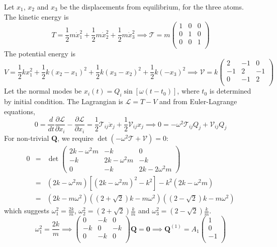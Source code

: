 \documentclass[a4paper]{article}
\begin{document}
\begin{ans}
Let $x_1$, $x_2$ and $x_3$ be the displacements from equilibrium, for the three atoms. The kinetic energy is 
$$T=\frac{1}{2}m\dot{x}_1^2+\frac{1}{2}m\dot{x}_2^2+\frac{1}{2}m\dot{x}_3^2\implies \mathcal{T}=m\begin{pmatrix}1&0&0\\0&1&0\\0&0&1\\\end{pmatrix}$$
The potential energy is
$$V=\frac{1}{2}kx_1^2+\frac{1}{2}k(x_2-x_1)^2+\frac{1}{2}k(x_3-x_2)^2+\frac{1}{2}k(-x_3)^2\implies \mathcal{V}=k\begin{pmatrix}2&-1&0\\-1&2&-1\\0&-1&2\\\end{pmatrix}$$
Let the normal modes be $x_i(t)=Q_i\sin[\omega(t-t_0)]$, where $t_0$ is determined by initial condition. The Lagrangian is $\mathcal{L}=T-V$ and from Euler-Lagrange equations,
$$0=\frac{d}{dt}\frac{\partial\mathcal{L}}{\partial\dot{x}_i}-\frac{\partial\mathcal{L}}{\partial x_i}=\frac{1}{2}\mathcal{T}_{ij}\ddot{x}_j+\frac{1}{2}\mathcal{V}_{ij}x_j\implies 0=-\omega^2\mathcal{T}_{ij}Q_j+\mathcal{V}_{ij}Q_j$$
For non-trivial $\mathbf{Q}$, we require $\det(-\omega^2\mathcal{T}+\mathcal{V})=0$:
\begin{eqnarray}
0&=&\det\begin{pmatrix}2k-\omega^2m&-k&0\\-k&2k-\omega^2m&-k\\0&-k&2k-2\omega^2m\end{pmatrix}\nonumber\\&=&(2k-\omega^2m)[(2k-\omega^2m)^2-k^2]-k^2(2k-\omega^2m)\nonumber\\&=&(2k-m\omega^2)((2+\sqrt{2})k-m\omega^2)((2-\sqrt{2})k-m\omega^2)\nonumber
\end{eqnarray}
which suggests $\omega_1^2=\frac{2k}{m}$, $\omega_2^2=(2+\sqrt{2})\frac{k}{m}$ and $\omega_3^2=(2-\sqrt{2})\frac{k}{m}$.
$$\omega_1^2=\frac{2k}{m}\implies\begin{pmatrix}0&-k&0\\-k&0&-k\\0&-k&0\\\end{pmatrix}\mathbf{Q}=\boldsymbol{0}\implies\mathbf{Q}^{(1)}=A_1\begin{pmatrix}1\\0\\-1\\\end{pmatrix}$$

\end{ans}
\end{document}
